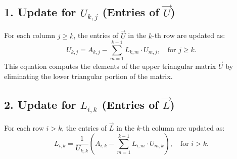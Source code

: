 \documentclass[journal]{IEEEtran}
\begin{document}
\begin{enumerate}
\subsection*{1. Update for $U_{k,j}$ (Entries of $\vec{U}$)}
For each column $j \geq k$, the entries of $\vec{U}$ in the $k$-th row are updated as:
\[
U_{k,j} = A_{k,j} - \sum_{m=1}^{k-1} L_{k,m} \cdot U_{m,j}, \quad \text{for } j \geq k.
\]
This equation computes the elements of the upper triangular matrix $\vec{U}$ by eliminating the lower triangular portion of the matrix.

\subsection*{2. Update for $L_{i,k}$ (Entries of $\vec{L}$)}
For each row $i > k$, the entries of $\vec{L}$ in the $k$-th column are updated as:
\[
L_{i,k} = \frac{1}{U_{k,k}} \left( A_{i,k} - \sum_{m=1}^{k-1} L_{i,m} \cdot U_{m,k} \right), \quad \text{for } i > k.
\]


\end{enumerate}
\end{document}
